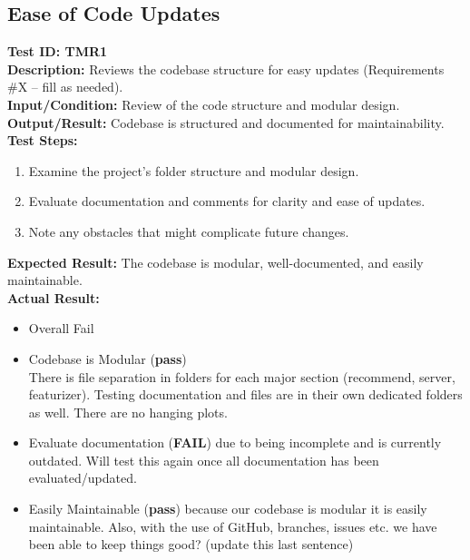 \documentclass[12pt, titlepage]{article}
\begin{document}
\subsection{Ease of Code Updates}
\textbf{Test ID: TMR1}\\
\textbf{Description:} Reviews the codebase structure for easy updates (Requirements \#X -- fill as needed).\\
\textbf{Input/Condition:} Review of the code structure and modular design.\\
\textbf{Output/Result:} Codebase is structured and documented for maintainability.\\
\textbf{Test Steps:}
\begin{enumerate}
    \item Examine the project's folder structure and modular design.
    \item Evaluate documentation and comments for clarity and ease of updates.
    \item Note any obstacles that might complicate future changes.
\end{enumerate}
\textbf{Expected Result:} The codebase is modular, well-documented, and easily maintainable.\\
\textbf{Actual Result:}
\begin{itemize}
    \item Overall Fail
    \item Codebase is Modular (\textbf{pass}) \\
          There is file separation in folders for each major section (recommend, server, featurizer). Testing documentation and files are in their own dedicated folders as well. There are no hanging plots.
    \item Evaluate documentation (\textbf{FAIL}) due to being incomplete and is currently outdated. Will test this again once all documentation has been evaluated/updated.
    \item Easily Maintainable (\textbf{pass}) because our codebase is modular it is easily maintainable. Also, with the use of GitHub, branches, issues etc. we have been able to keep things good? (update this last sentence)
\end{itemize}
\end{document}
